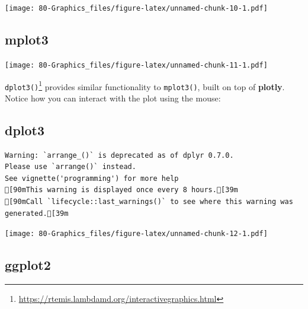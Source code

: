 \documentclass[
]{book}
\newenvironment{Shaded}{\begin{snugshade}}{\end{snugshade}}
\newcommand{\FunctionTok}[1]{\textcolor[rgb]{0.00,0.00,0.00}{#1}}
\newcommand{\NormalTok}[1]{#1}
\newcommand{\SpecialCharTok}[1]{\textcolor[rgb]{0.00,0.00,0.00}{#1}}
\renewcommand{\href}[2]{#2\footnote{\url{#1}}}
\begin{document}
\texttt{[image: 80-Graphics\_files/figure-latex/unnamed-chunk-10-1.pdf]}

\hypertarget{mplot3}{%
\subsection{\texorpdfstring{\textbf{mplot3}}{mplot3}}\label{mplot3}}

\begin{Shaded}
\end{Shaded}

\texttt{[image: 80-Graphics\_files/figure-latex/unnamed-chunk-11-1.pdf]}

\href{https://rtemis.lambdamd.org/interactivegraphics.html}{\texttt{dplot3()}} provides similar functionality to \texttt{mplot3()}, built on top of \textbf{plotly}. Notice how you can interact with the plot using the mouse:

\hypertarget{dplot3}{%
\subsection{\texorpdfstring{\textbf{dplot3}}{dplot3}}\label{dplot3}}

\begin{Shaded}
\end{Shaded}

\begin{verbatim}
Warning: `arrange_()` is deprecated as of dplyr 0.7.0.
Please use `arrange()` instead.
See vignette('programming') for more help
[90mThis warning is displayed once every 8 hours.[39m
[90mCall `lifecycle::last_warnings()` to see where this warning was generated.[39m
\end{verbatim}

\texttt{[image: 80-Graphics\_files/figure-latex/unnamed-chunk-12-1.pdf]}

\hypertarget{ggplot2-1}{%
\subsection{\texorpdfstring{\textbf{ggplot2}}{ggplot2}}\label{ggplot2-1}}
\end{document}
